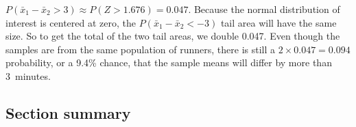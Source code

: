 \begin{examplewrap}
\begin{nexample}
$P(\bar{x}_1-\bar{x}_2>3)\approx P(Z > 1.676) = 0.047$.
Because the normal distribution of interest is centered at zero,
the $P(\bar{x}_1 - \bar{x}_2< -3)$ tail area will have the same size.
So to get the total of the two tail areas, we double 0.047.
Even though the samples are from the same population of runners,
there is still a $2\times 0.047 = 0.094$ probability, or a 9.4\% chance, that the sample means will differ by more than 3~minutes.
\end{nexample}
\end{examplewrap}


\D{\newpage}

\subsection*{Section summary}

